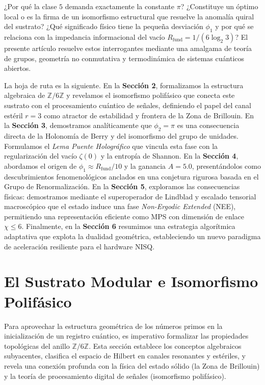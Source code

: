 \documentclass[12pt,a4paper]{article}
\theoremstyle{plain}
\theoremstyle{definition}
\theoremstyle{remark}
\begin{document}
¿Por qué la clase $5$ demanda exactamente la constante $\pi$? ¿Constituye un óptimo local o es la firma de un isomorfismo estructural que resuelve la anomalía quiral del sustrato? ¿Qué significado físico tiene la pequeña desviación $\phi_1$ y por qué se relaciona con la impedancia informacional del vacío $R_{\text{fund}} = 1/(6\log_2 3)$? El presente artículo resuelve estos interrogantes mediante una amalgama de teoría de grupos, geometría no conmutativa y termodinámica de sistemas cuánticos abiertos.

La hoja de ruta es la siguiente. En la \textbf{Sección 2}, formalizamos la estructura algebraica de $\mathbb{Z}/6\mathbb{Z}$ y revelamos el isomorfismo polifásico que conecta este sustrato con el procesamiento cuántico de señales, definiendo el papel del canal estéril $r=3$ como atractor de estabilidad y frontera de la Zona de Brillouin. En la \textbf{Sección 3}, demostramos analíticamente que $\phi_2 = \pi$ es una consecuencia directa de la Holonomía de Berry y del isomorfismo del grupo de unidades. Formulamos el \textit{Lema Puente Holográfico} que vincula esta fase con la regularización del vacío $\zeta(0)$ y la entropía de Shannon. En la \textbf{Sección 4}, abordamos el origen de $\phi_1 \approx R_{\text{fund}}/10$ y la ganancia $A=5.0$, presentándolos como descubrimientos fenomenológicos anclados en una conjetura rigurosa basada en el Grupo de Renormalización. En la \textbf{Sección 5}, exploramos las consecuencias físicas: demostramos mediante el superoperador de Lindblad y escalado tensorial macroscópico que el estado induce una fase \textit{Non-Ergodic Extended} (NEE), permitiendo una representación eficiente como MPS con dimensión de enlace $\chi \le 6$. Finalmente, en la \textbf{Sección 6} resumimos una estrategia algorítmica adaptativa que explota la dualidad geométrica, estableciendo un nuevo paradigma de aceleración resiliente para el hardware NISQ.

\section{El Sustrato Modular e Isomorfismo Polifásico}
\label{sec:sustrato_modular}

Para aprovechar la estructura geométrica de los números primos en la inicialización de un registro cuántico, es imperativo formalizar las propiedades topológicas del anillo $\mathbb{Z}/6\mathbb{Z}$. Esta sección establece los conceptos algebraicos subyacentes, clasifica el espacio de Hilbert en canales resonantes y estériles, y revela una conexión profunda con la física del estado sólido (la Zona de Brillouin) y la teoría de procesamiento digital de señales (isomorfismo polifásico).
\end{document}
